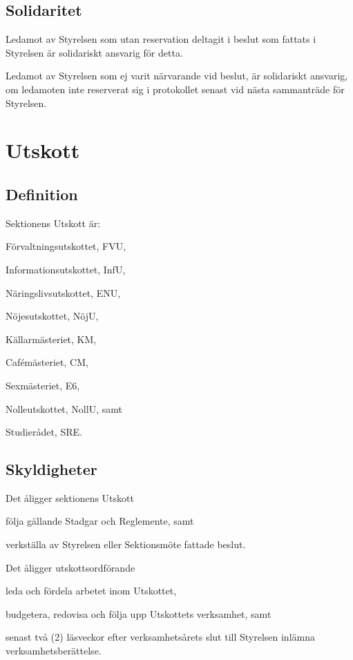 \documentclass[10pt]{article}
\begin{document}
    
    \subsection{Solidaritet}
    Ledamot av Styrelsen som utan reservation deltagit i beslut som fattats i
    Styrelsen är solidariskt ansvarig för detta.
    
    Ledamot av Styrelsen som ej varit närvarande vid beslut, är solidariskt
    ansvarig, om ledamoten inte reserverat sig i protokollet senast vid nästa
    sammanträde för Styrelsen.
    \newpage
    
    \section{Utskott}
    \subsection{Definition}
    Sektionens Utskott är:
    \begin{alphlist}
    \item Förvaltningsutskottet, FVU,
    \item Informationsutskottet, InfU,
    \item Näringslivsutskottet, ENU,
    \item Nöjesutskottet, NöjU,
    \item Källarmästeriet, KM,
    \item Cafémästeriet, CM,
    \item Sexmästeriet, E6,
    \item Nolleutskottet, NollU, samt
    \item Studierådet, SRE.
    \end{alphlist}
    
    \subsection{Skyldigheter}
    Det åligger sektionens Utskott
    \begin{attlist}
    \item följa gällande Stadgar och Reglemente, samt
    \item verkställa av Styrelsen eller Sektionsmöte fattade beslut.
    \end{attlist}
    Det åligger utskottsordförande
    \begin{attlist}
    \item leda och fördela arbetet inom Utskottet,
    \item budgetera, redovisa och följa upp Utskottets verksamhet, samt
    \item senast två (2) läsveckor efter verksamhetsårets slut till Styrelsen
        inlämna verksamhetsberättelse.
    \end{attlist}
    
\end{document}
